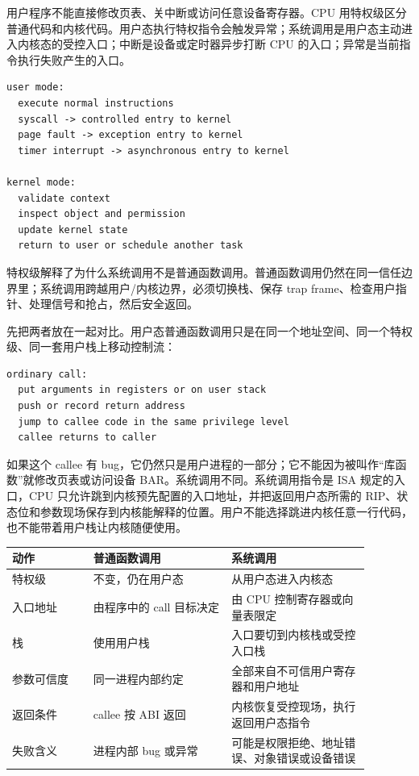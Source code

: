 用户程序不能直接修改页表、关中断或访问任意设备寄存器。CPU 用特权级区分普通代码和内核代码。用户态执行特权指令会触发异常；系统调用是用户态主动进入内核态的受控入口；中断是设备或定时器异步打断 CPU 的入口；异常是当前指令执行失败产生的入口。

\begin{lstlisting}
user mode:
  execute normal instructions
  syscall -> controlled entry to kernel
  page fault -> exception entry to kernel
  timer interrupt -> asynchronous entry to kernel

kernel mode:
  validate context
  inspect object and permission
  update kernel state
  return to user or schedule another task
\end{lstlisting}

特权级解释了为什么系统调用不是普通函数调用。普通函数调用仍然在同一信任边界里；系统调用跨越用户/内核边界，必须切换栈、保存 trap frame、检查用户指针、处理信号和抢占，然后安全返回。

先把两者放在一起对比。用户态普通函数调用只是在同一个地址空间、同一个特权级、同一套用户栈上移动控制流：

\begin{lstlisting}
ordinary call:
  put arguments in registers or on user stack
  push or record return address
  jump to callee code in the same privilege level
  callee returns to caller
\end{lstlisting}

如果这个 callee 有 bug，它仍然只是用户进程的一部分；它不能因为被叫作“库函数”就修改页表或访问设备 BAR。系统调用不同。系统调用指令是 ISA 规定的入口，CPU 只允许跳到内核预先配置的入口地址，并把返回用户态所需的 RIP、状态位和参数现场保存到内核能解释的位置。用户不能选择跳进内核任意一行代码，也不能带着用户栈让内核随便使用。

\begin{longtable}{p{0.2\linewidth}p{0.34\linewidth}p{0.34\linewidth}}
\toprule
动作 & 普通函数调用 & 系统调用 \\
\midrule
特权级 & 不变，仍在用户态 & 从用户态进入内核态 \\
入口地址 & 由程序中的 call 目标决定 & 由 CPU 控制寄存器或向量表限定 \\
栈 & 使用用户栈 & 入口要切到内核栈或受控入口栈 \\
参数可信度 & 同一进程内部约定 & 全部来自不可信用户寄存器和用户地址 \\
返回条件 & callee 按 ABI 返回 & 内核恢复受控现场，执行返回用户态指令 \\
失败含义 & 进程内部 bug 或异常 & 可能是权限拒绝、地址错误、对象错误或设备错误 \\
\bottomrule
\end{longtable}

